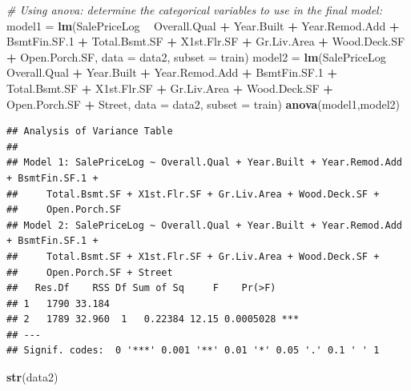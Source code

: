 \documentclass[
]{article}
\newenvironment{Shaded}{\begin{snugshade}}{\end{snugshade}}
\newcommand{\CommentTok}[1]{\textcolor[rgb]{0.56,0.35,0.01}{\textit{#1}}}
\newcommand{\DataTypeTok}[1]{\textcolor[rgb]{0.13,0.29,0.53}{#1}}
\newcommand{\FloatTok}[1]{\textcolor[rgb]{0.00,0.00,0.81}{#1}}
\newcommand{\KeywordTok}[1]{\textcolor[rgb]{0.13,0.29,0.53}{\textbf{#1}}}
\newcommand{\NormalTok}[1]{#1}
\newcommand{\OperatorTok}[1]{\textcolor[rgb]{0.81,0.36,0.00}{\textbf{#1}}}
\newcommand{\StringTok}[1]{\textcolor[rgb]{0.31,0.60,0.02}{#1}}
\begin{document}
\begin{Shaded}
\begin{Highlighting}[]
\CommentTok{# Using anova: determine the categorical variables to use in the final model:}
\NormalTok{model1 =}\StringTok{ }\KeywordTok{lm}\NormalTok{(SalePriceLog }\OperatorTok{~}\StringTok{ }\NormalTok{Overall.Qual }\OperatorTok{+}\StringTok{ }\NormalTok{Year.Built }\OperatorTok{+}\StringTok{ }\NormalTok{Year.Remod.Add }\OperatorTok{+}\StringTok{ }\NormalTok{BsmtFin.SF}\FloatTok{.1} \OperatorTok{+}\StringTok{ }\NormalTok{Total.Bsmt.SF }\OperatorTok{+}\StringTok{ }\NormalTok{X1st.Flr.SF }\OperatorTok{+}\StringTok{ }\NormalTok{Gr.Liv.Area }\OperatorTok{+}\StringTok{ }\NormalTok{Wood.Deck.SF }\OperatorTok{+}\StringTok{ }\NormalTok{Open.Porch.SF, }\DataTypeTok{data =}\NormalTok{ data2, }\DataTypeTok{subset =}\NormalTok{ train)}
\NormalTok{model2 =}\StringTok{ }\KeywordTok{lm}\NormalTok{(SalePriceLog }\OperatorTok{~}\StringTok{ }\NormalTok{Overall.Qual }\OperatorTok{+}\StringTok{ }\NormalTok{Year.Built }\OperatorTok{+}\StringTok{ }\NormalTok{Year.Remod.Add }\OperatorTok{+}\StringTok{ }\NormalTok{BsmtFin.SF}\FloatTok{.1} \OperatorTok{+}\StringTok{ }\NormalTok{Total.Bsmt.SF }\OperatorTok{+}\StringTok{ }\NormalTok{X1st.Flr.SF }\OperatorTok{+}\StringTok{ }\NormalTok{Gr.Liv.Area }\OperatorTok{+}\StringTok{ }\NormalTok{Wood.Deck.SF }\OperatorTok{+}\StringTok{ }\NormalTok{Open.Porch.SF }\OperatorTok{+}\StringTok{ }\NormalTok{Street, }\DataTypeTok{data =}\NormalTok{ data2, }\DataTypeTok{subset =}\NormalTok{ train)}
\KeywordTok{anova}\NormalTok{(model1,model2)}
\end{Highlighting}
\end{Shaded}

\begin{verbatim}
## Analysis of Variance Table
## 
## Model 1: SalePriceLog ~ Overall.Qual + Year.Built + Year.Remod.Add + BsmtFin.SF.1 + 
##     Total.Bsmt.SF + X1st.Flr.SF + Gr.Liv.Area + Wood.Deck.SF + 
##     Open.Porch.SF
## Model 2: SalePriceLog ~ Overall.Qual + Year.Built + Year.Remod.Add + BsmtFin.SF.1 + 
##     Total.Bsmt.SF + X1st.Flr.SF + Gr.Liv.Area + Wood.Deck.SF + 
##     Open.Porch.SF + Street
##   Res.Df    RSS Df Sum of Sq     F    Pr(>F)    
## 1   1790 33.184                                 
## 2   1789 32.960  1   0.22384 12.15 0.0005028 ***
## ---
## Signif. codes:  0 '***' 0.001 '**' 0.01 '*' 0.05 '.' 0.1 ' ' 1
\end{verbatim}

\begin{Shaded}
\begin{Highlighting}[]
\KeywordTok{str}\NormalTok{(data2)}
\end{Highlighting}
\end{Shaded}
\end{document}
